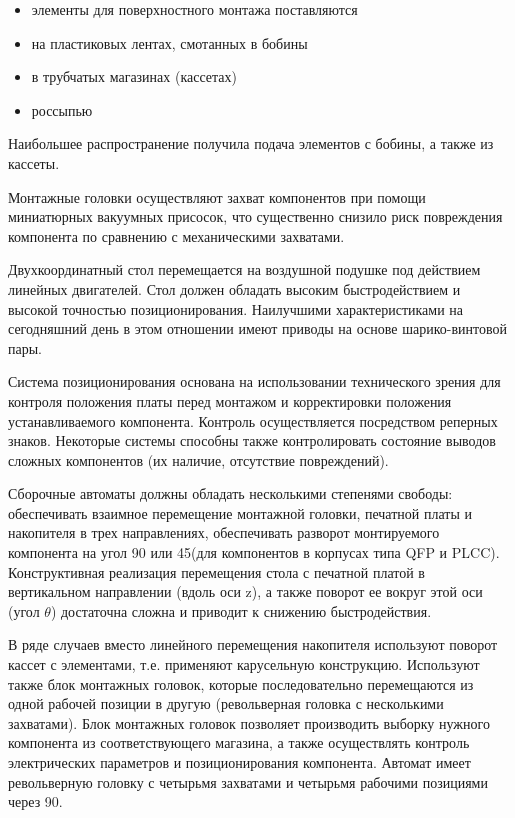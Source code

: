 \documentclass[unicode, 12pt, a4paper, oneside]{article}
\begin{document}
\begin{itemize}
\item элементы для поверхностного монтажа поставляются
\item на пластиковых лентах, смотанных в бобины
\item в трубчатых магазинах (кассетах)
\item россыпью
\end{itemize}

Наибольшее распространение получила подача элементов с бобины, а также из кассеты.

Монтажные головки осуществляют захват компонентов при помощи миниатюрных вакуумных присосок, что существенно снизило риск повреждения компонента по сравнению с механическими захватами.

Двухкоординатный стол перемещается на воздушной подушке под действием линейных двигателей. Стол должен обладать высоким быстродействием и высокой точностью позиционирования. Наилучшими характеристиками на сегодняшний день в этом отношении имеют приводы на основе шарико-винтовой пары.

Система позиционирования основана на использовании технического зрения  для контроля положения платы перед монтажом и корректировки положения устанавливаемого компонента. Контроль осуществляется посредством реперных знаков. Некоторые системы способны также контролировать состояние выводов сложных компонентов (их наличие, отсутствие повреждений).

Сборочные автоматы должны обладать несколькими степенями свободы: обеспечивать взаимное перемещение монтажной головки, печатной платы и накопителя в трех направлениях, обеспечивать разворот монтируемого компонента  на угол 90 или 45\textdegree (для компонентов в корпусах типа QFP и PLCC). Конструктивная реализация перемещения стола с печатной платой в вертикальном направлении (вдоль оси z), а также поворот ее вокруг этой оси (угол $\theta$) достаточна сложна и приводит к снижению быстродействия.

В ряде случаев вместо линейного перемещения накопителя используют поворот кассет с элементами, т.е. применяют карусельную конструкцию. Используют также блок монтажных головок, которые последовательно перемещаются  из одной рабочей позиции в другую (револьверная головка с несколькими захватами). Блок монтажных головок позволяет производить выборку нужного компонента из соответствующего магазина, а также осуществлять контроль электрических параметров и позиционирования компонента. Автомат имеет револьверную головку с четырьмя захватами и четырьмя рабочими позициями через 90\textdegree.
\end{document}
